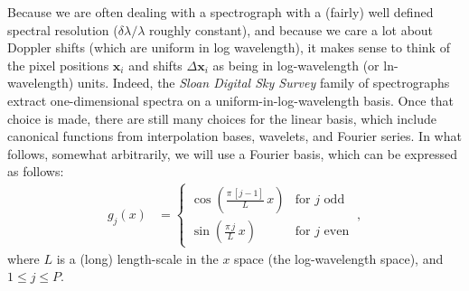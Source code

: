 \documentclass[modern, linenumbers]{aastex631}
\newcommand{\modified}[1]{\textcolor{Emerald}{\textbf{#1}}}
\begin{document}
Because we are often dealing with a spectrograph with a (fairly) well defined spectral resolution ($\delta\lambda/\lambda$ roughly constant), and because we care a lot about Doppler shifts (which are uniform in log wavelength), it makes sense to think of the pixel positions \modified{$\mathbf{x}_i$} and shifts \modified{$\Delta\mathbf{x}_i$} as being in log-wavelength (or ln-wavelength) units.
Indeed, the \textsl{Sloan Digital Sky Survey} family of spectrographs extract one-dimensional spectra on a uniform-in-log-wavelength basis.
Once that choice is made, there are still many choices for the linear basis,
which include canonical functions from interpolation bases, wavelets, and Fourier series.
In what follows, somewhat arbitrarily, we will use a Fourier basis, which can be expressed as follows:
\begin{align}
    g_j(x) & = \left\{\begin{array}{cl}\displaystyle\cos\left(\frac{\pi\,[j-1]}{L}\,x\right) & \mbox{for $j$ odd} \\[3ex]
    \displaystyle\sin\left(\frac{\pi\,j}{L}\,x\right) & \mbox{for $j$ even}\end{array}\right. ~,\label{eq:basis}
\end{align}
where $L$ is a (long) length-scale in the $x$ space (the log-wavelength space), and $1\leq j\leq P$.
\end{document}
